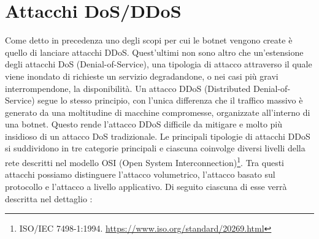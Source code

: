 \section{Attacchi DoS/DDoS}
Come detto in precedenza uno degli scopi per cui le botnet vengono create è quello di lanciare attacchi DDoS. Quest'ultimi non sono altro che un'estensione degli attacchi DoS (Denial-of-Service), una tipologia di attacco attraverso il quale viene inondato di richieste un servizio degradandone, o nei casi più gravi interrompendone, la disponibilità. Un attacco DDoS (Distributed Denial-of-Service) segue lo stesso principio, con l'unica differenza che il traffico massivo è generato da una moltitudine di macchine compromesse, organizzate all'interno di una botnet. Questo rende l'attacco DDoS difficile da mitigare e molto più insidioso di un attacco DoS tradizionale. Le principali tipologie di attacchi DDoS si suddividono in tre categorie principali e ciascuna coinvolge diversi livelli della rete descritti nel modello OSI (Open System Interconnection)\footnote{ISO/IEC 7498-1:1994. \url{https://www.iso.org/standard/20269.html}}. Tra questi attacchi possiamo distinguere l'attacco volumetrico, l'attacco basato sul protocollo e l'attacco a livello applicativo. Di seguito ciascuna di esse verrà descritta nel dettaglio \cite{ddos_info}: 
